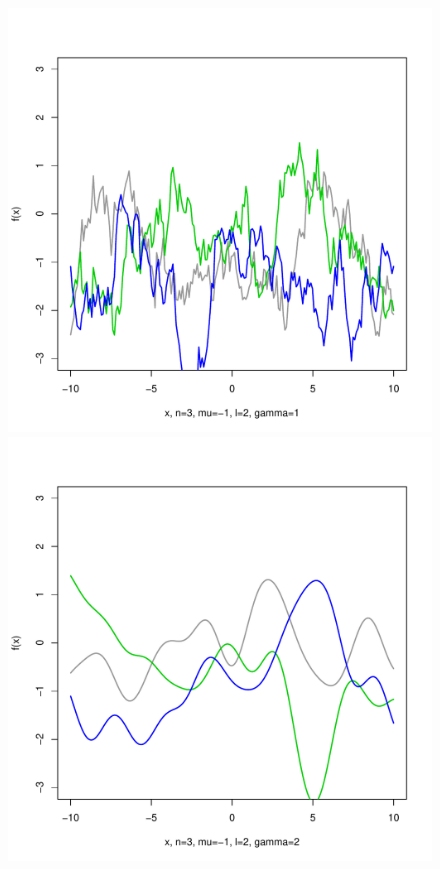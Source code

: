\documentclass[12pt,letterpaper]{article}
\begin{document}
\begin{figure}
\begin{center}
\includegraphics[scale=0.2]{hw321/n3-m-1-l2-g2.pdf}
\includegraphics[scale=0.2]{hw321/n3-m-1-l2-g4.pdf}

\end{center}
\end{figure}
\end{document}
